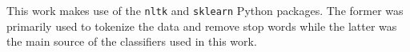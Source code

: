 This work makes use of the \texttt{nltk} \cite{bird2009} and \texttt{sklearn} \cite{scikit-learn} Python packages.  The former was primarily used to tokenize the data and remove stop words while the latter was the main source of the classifiers used in this work.